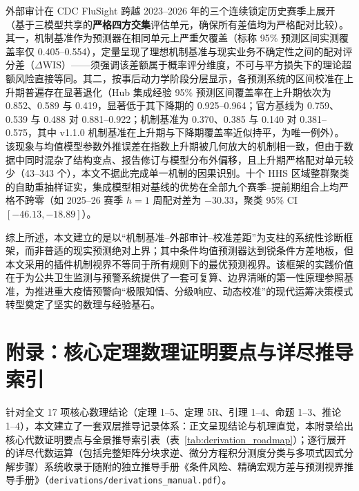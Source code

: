 \documentclass[10pt,a4paper]{article}
\theoremstyle{plain}
\theoremstyle{definition}
\begin{document}
外部审计在 CDC FluSight 跨越 2023--2026 年的三个连续锁定历史赛季上展开（基于三模型共享的\textbf{严格四方交集}评估单元，确保所有差值均为严格配对比较）。其一，机制基准作为预测器在相同单元上严重欠覆盖（标称 95\% 预测区间实测覆盖率仅 0.405--0.554），定量呈现了理想机制基准与现实业务不确定性之间的配对评分差（$\Delta\mathrm{WIS}$）——须强调该差额属于概率评分维度，不可与平方损失下的理论超额风险直接等同。其二，按事后动力学阶段分层显示，各预测系统的区间校准在上升期普遍存在显著退化（Hub 集成经验 95\% 预测区间覆盖率在上升期依次为 0.852、0.589 与 0.419，显著低于其下降期的 0.925--0.964；官方基线为 0.759、0.539 与 0.488 对 0.881--0.922；机制基准为 0.370、0.385 与 0.140 对 0.381--0.575，其中 v1.1.0 机制基准在上升期与下降期覆盖率近似持平，为唯一例外）。该现象与均值模型参数外推误差在指数上升期被几何放大的机制相一致，但由于数据中同时混杂了结构变点、报告修订与模型分布外偏移，且上升期严格配对单元较少（43--343 个），本文不据此完成单一机制的因果识别。十个 HHS 区域整群聚类的自助重抽样证实，集成模型相对基线的优势在全部九个赛季--提前期组合上均严格不跨零（如 2025--26 赛季 $h=1$ 周配对差为 $-30.33$，聚类 95\% CI $[-46.13, -18.89]$）。

综上所述，本文建立的是以“机制基准--外部审计--校准差距”为支柱的系统性诊断框架，而非普适的现实预测绝对上界；其中条件均值预测器达到锐条件方差地板，但本文采用的插件机制视界不等同于所有规则下的最优预测视界。该框架的实践价值在于为公共卫生监测与预警系统提供了一套可复算、边界清晰的第一性原理参照基准，为推进重大疫情预警向“极限知情、分级响应、动态校准”的现代运筹决策模式转型奠定了坚实的数理与经验基石。

\clearpage
\appendix
\section*{附录：核心定理数理证明要点与详尽推导索引}

针对全文 17 项核心数理结论（定理 1--5、定理 5R、引理 1--4、命题 1--3、推论 1--4），本文建立了一套双层推导记录体系：正文呈现结论与机理直觉，本附录给出核心代数证明要点与全景推导索引表（表~\ref{tab:derivation_roadmap}）；逐行展开的详尽代数运算（包括完整矩阵分块求逆、微分方程积分测度分类与多项式因式分解步骤）系统收录于随附的独立推导手册《条件风险、精确宏观方差与预测视界推导手册》（\texttt{derivations/derivations\_manual.pdf}）。
\end{document}
